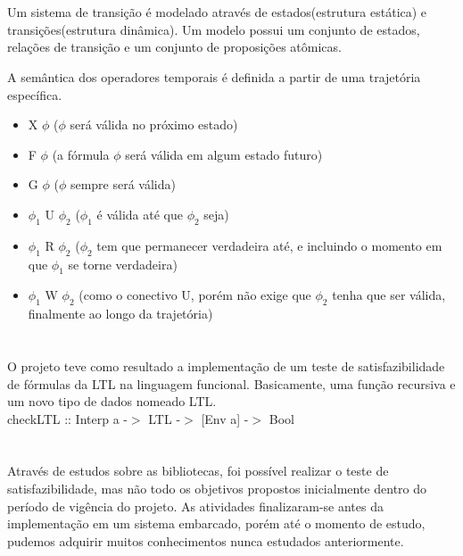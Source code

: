 \documentclass{sciposter}
\newcommand{\tituloA}[1]{\Large{\emph{\textbf{\color{white}{#1}}}}}
\begin{document}
\begin{multicols}{3}
{\section*{\tituloA{Semântica da Lógica Temporal}}

Um sistema de transição é modelado através de estados(estrutura estática) e transições(estrutura dinâmica). Um modelo possui um conjunto de estados, relações de transição e um conjunto de proposições atômicas.
\par A semântica dos operadores temporais é definida a partir de uma trajetória específica.
\begin{itemize}
	\item X $\phi$ ($\phi$ será válida no próximo estado)
	\item F $\phi$ (a fórmula $\phi$ será válida em algum estado futuro)
	\item G $\phi$ ($\phi$ sempre será válida)
	\item $\phi _{1}$ U $\phi _{2}$ ($\phi _{1}$ é válida até que $\phi _{2}$ seja)
	\item $\phi _{1}$ R $\phi _{2}$ ($\phi _{2}$ tem que permanecer verdadeira até, e incluindo o momento em que $\phi _{1}$ se torne verdadeira)
	\item $\phi _{1}$ W $\phi _{2}$ (como o conectivo U, porém não exige que $\phi _{2}$ tenha que ser válida, finalmente ao longo da trajetória) 
\end{itemize}

\section*{\tituloA{Resultados Obtidos}}
O projeto teve como resultado a implementação de um teste de satisfazibilidade de fórmulas da LTL na linguagem funcional. Basicamente, uma função recursiva e um novo tipo de dados nomeado LTL.\\
checkLTL :: Interp a -$>$ LTL -$>$ [Env a] -$>$ Bool	

\section*{\tituloA{Conclusões}}
Através de estudos sobre as bibliotecas, foi possível realizar o teste de satisfazibilidade, mas não todo os objetivos propostos inicialmente dentro do período de vigência do projeto. As atividades finalizaram-se antes da implementação em um sistema embarcado, porém até o momento de estudo, pudemos adquirir muitos conhecimentos nunca estudados anteriormente.

  \section*{\tituloA{Referências}}
  \renewcommand{\section}[2]{}%
  
  


  }\end{multicols}
\end{document}
